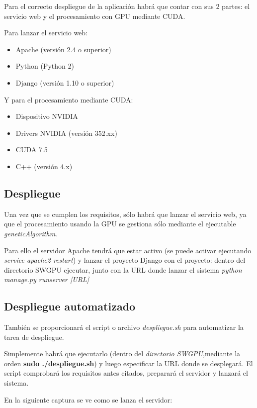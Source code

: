 Para el correcto despliegue de la aplicación habrá que contar con sus 2 partes: el servicio web y el procesamiento con GPU mediante CUDA.

\bigskip
Para lanzar el servicio web:
\begin{itemize}
	\item Apache (versión 2.4 o superior)
	\item Python (Python 2)
	\item Django  (versión 1.10 o superior)
\end{itemize} 

\bigskip
Y para el procesamiento mediante CUDA:
\begin{itemize}
	\item Dispositivo NVIDIA
	\item Drivers NVIDIA (versión 352.xx)
	\item CUDA 7.5
	\item C++ (versión 4.x)
\end{itemize} 

\subsection{Despliegue}
\bigskip


Una vez que se cumplen los requisitos, sólo habrá que lanzar el servicio web, ya que el procesamiento usando la GPU se gestiona sólo mediante el ejecutable \textit{geneticAlgorithm}.

Para ello el servidor Apache tendrá que estar activo (se puede activar ejecutando \textit{service apache2 restart}) y lanzar el proyecto Django con el proyecto: dentro del directorio SWGPU ejecutar, junto con la URL donde lanzar el sistema \textit{python manage.py runserver [URL]}


\subsection{Despliegue automatizado}
\bigskip
También se proporcionará el script o archivo \textit{despliegue.sh} para automatizar la tarea de despliegue.

Simplemente habrá que ejecutarlo (dentro del \textit{directorio SWGPU},mediante la orden \textbf{sudo ./despliegue.sh}) y luego especificar la URL donde se desplegará. El script comprobará los requisitos antes citados, preparará el servidor y lanzará el sistema.

En la siguiente captura se ve como se lanza el servidor:

